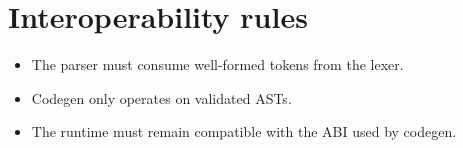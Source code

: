 \documentclass[11pt,a4paper]{article}
\begin{document}
\section{Interoperability rules}
\begin{itemize}
    \item The parser must consume well-formed tokens from the lexer.
    \item Codegen only operates on validated ASTs.
    \item The runtime must remain compatible with the ABI used by codegen.
\end{itemize}
\end{document}
